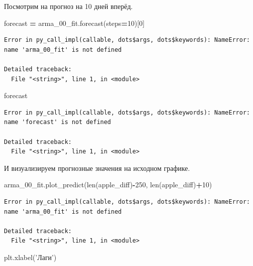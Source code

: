 \documentclass[]{book}
\newenvironment{Shaded}{\begin{snugshade}}{\end{snugshade}}
\newcommand{\BuiltInTok}[1]{#1}
\newcommand{\DecValTok}[1]{\textcolor[rgb]{0.00,0.00,0.81}{#1}}
\newcommand{\NormalTok}[1]{#1}
\newcommand{\OperatorTok}[1]{\textcolor[rgb]{0.81,0.36,0.00}{\textbf{#1}}}
\newcommand{\StringTok}[1]{\textcolor[rgb]{0.31,0.60,0.02}{#1}}
\begin{document}
Посмотрим на прогноз на 10 дней вперёд.

\begin{Shaded}
\begin{Highlighting}[]
\NormalTok{forecast }\OperatorTok{=}\NormalTok{ arma_00_fit.forecast(steps}\OperatorTok{=}\DecValTok{10}\NormalTok{)[}\DecValTok{0}\NormalTok{]}
\end{Highlighting}
\end{Shaded}

\begin{verbatim}
Error in py_call_impl(callable, dots$args, dots$keywords): NameError: name 'arma_00_fit' is not defined

Detailed traceback: 
  File "<string>", line 1, in <module>
\end{verbatim}

\begin{Shaded}
\begin{Highlighting}[]
\NormalTok{forecast}
\end{Highlighting}
\end{Shaded}

\begin{verbatim}
Error in py_call_impl(callable, dots$args, dots$keywords): NameError: name 'forecast' is not defined

Detailed traceback: 
  File "<string>", line 1, in <module>
\end{verbatim}

И визуализируем прогнозные значения на исходном графике.

\begin{Shaded}
\begin{Highlighting}[]
\NormalTok{arma_00_fit.plot_predict(}\BuiltInTok{len}\NormalTok{(apple_diff)}\OperatorTok{-}\DecValTok{250}\NormalTok{, }\BuiltInTok{len}\NormalTok{(apple_diff)}\OperatorTok{+}\DecValTok{10}\NormalTok{)}
\end{Highlighting}
\end{Shaded}

\begin{verbatim}
Error in py_call_impl(callable, dots$args, dots$keywords): NameError: name 'arma_00_fit' is not defined

Detailed traceback: 
  File "<string>", line 1, in <module>
\end{verbatim}

\begin{Shaded}
\begin{Highlighting}[]
\NormalTok{plt.xlabel(}\StringTok{'Лаги'}\NormalTok{)}
\end{Highlighting}
\end{Shaded}
\end{document}
